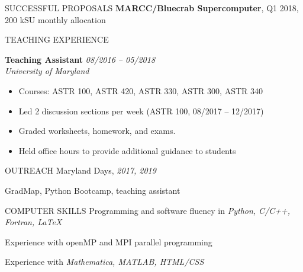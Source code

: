 \documentclass[letterpaper]{resume} %
\begin{document}
\begin{rSection}{SUCCESSFUL PROPOSALS}
{\bf MARCC/Bluecrab Supercomputer}, Q1 2018, 200 kSU monthly allocation
\end{rSection}


\begin{rSection}{TEACHING EXPERIENCE} \itemsep -3pt
\renewcommand\labelitemi{\tiny$\bullet$}

{\bf Teaching Assistant} \hfill {\em 08/2016 -- 05/2018}\\
  \emph{University of Maryland}
  \begin{itemize}[noitemsep,topsep=-2pt]
  \item Courses: ASTR 100, ASTR 420, ASTR 330, ASTR 300, ASTR 340
  \item Led 2 discussion sections per week (ASTR 100, 08/2017 -- 12/2017) 
  \item Graded worksheets, homework, and exams.
  \item Held office hours to provide additional guidance to students
  \end{itemize}
\end{rSection}

\begin{rSection}{OUTREACH}
  Maryland Days, {\it 2017, 2019}
\item GradMap, Python Bootcamp, teaching assistant 
\end{rSection}

\begin{rSection}{COMPUTER SKILLS}
Programming and software fluency in {\em Python, C/C++, Fortran, \LaTeX}
\item Experience with openMP and MPI parallel programming
\item Experience with {\em Mathematica, MATLAB, HTML/CSS}
\end{rSection}
\end{document}
